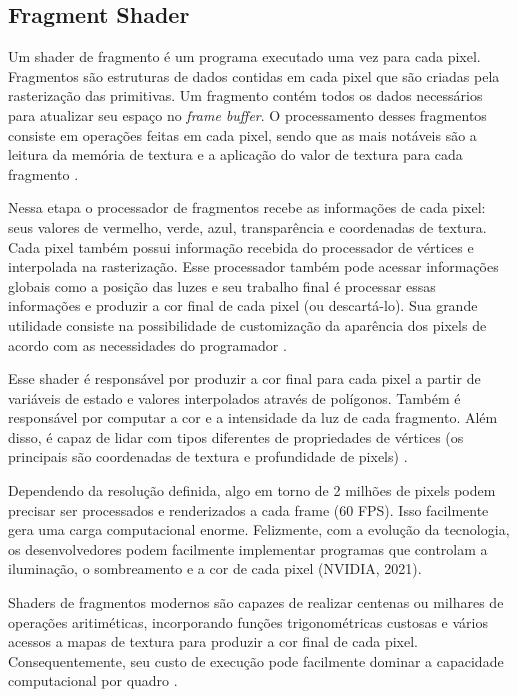 \subsection{Fragment Shader}
\label{sec:fragment-shader}

Um shader de fragmento é um programa executado uma vez para cada pixel. Fragmentos são estruturas de dados contidas em cada pixel que são criadas pela rasterização das primitivas. Um fragmento contém todos os dados necessários para atualizar seu espaço no \textit{frame buffer}. O processamento desses fragmentos consiste em operações feitas em cada pixel, sendo que as mais notáveis são a leitura da memória de textura e a aplicação do valor de textura para cada fragmento \cite{GLSLBook}. 

Nessa etapa o processador de fragmentos recebe as informações de cada pixel: seus valores de vermelho, verde, azul, transparência e coordenadas de textura. Cada pixel também possui informação recebida do processador de vértices e interpolada na rasterização. Esse processador também pode acessar informações globais como a posição das luzes e seu trabalho final é processar essas informações e produzir a cor final de cada pixel (ou descartá-lo). Sua grande utilidade consiste na possibilidade de customização da aparência dos pixels de acordo com as necessidades do programador \cite{bailey2007}. 

Esse shader é responsável por produzir a cor final para cada pixel a partir de variáveis de estado e valores interpolados através de polígonos. Também é responsável por computar a cor e a intensidade da luz de cada fragmento. Além disso, é capaz de lidar com tipos diferentes de propriedades de vértices (os principais são coordenadas de textura e profundidade de pixels) \cite{hasu2018modern}. 

Dependendo da resolução definida, algo em torno de 2 milhões de pixels podem precisar ser processados e renderizados a cada frame (60 FPS). Isso facilmente gera uma carga computacional enorme. Felizmente, com a evolução da tecnologia, os desenvolvedores podem facilmente implementar programas que controlam a iluminação, o sombreamento e a cor de cada pixel (NVIDIA, 2021)\nocite{fragShader}.

Shaders de fragmentos modernos são capazes de realizar centenas ou milhares de operações aritiméticas, incorporando funções trigonométricas custosas e vários acessos a mapas de textura para produzir a cor final de cada pixel. Consequentemente, seu custo de execução pode facilmente dominar a capacidade computacional por quadro \cite{lei2008acm}.

